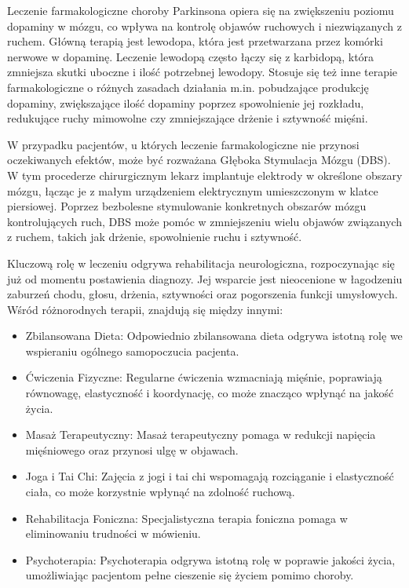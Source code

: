 Leczenie farmakologiczne choroby Parkinsona opiera się na zwiększeniu poziomu dopaminy w mózgu, co wpływa na kontrolę objawów
ruchowych i niezwiązanych z ruchem. Główną terapią jest lewodopa, która jest przetwarzana przez komórki nerwowe w dopaminę.
Leczenie lewodopą często łączy się z karbidopą, która zmniejsza skutki uboczne i ilość potrzebnej lewodopy.
Stosuje się też inne terapie farmakologiczne o różnych zasadach działania m.in. pobudzające produkcję dopaminy,
zwiększające ilość dopaminy poprzez spowolnienie jej rozkładu, redukujące ruchy mimowolne czy zmniejszające drżenie i sztywność mięśni.

W przypadku pacjentów, u których leczenie farmakologiczne nie przynosi oczekiwanych efektów, może być rozważana Głęboka Stymulacja Mózgu (DBS).
W tym procederze chirurgicznym lekarz implantuje elektrody w określone obszary mózgu, łącząc je z małym urządzeniem elektrycznym umieszczonym w klatce piersiowej.
Poprzez bezbolesne stymulowanie konkretnych obszarów mózgu kontrolujących ruch, DBS może pomóc w zmniejszeniu wielu objawów związanych z ruchem,
takich jak drżenie, spowolnienie ruchu i sztywność.

Kluczową rolę w leczeniu odgrywa rehabilitacja neurologiczna, rozpoczynając się już od momentu postawienia diagnozy.
Jej wsparcie jest nieocenione w łagodzeniu zaburzeń chodu, głosu, drżenia, sztywności oraz pogorszenia funkcji umysłowych.
Wśród różnorodnych terapii, znajdują się między innymi:
\begin{itemize}[itemsep=0.1pt]
	\item Zbilansowana Dieta: Odpowiednio zbilansowana dieta odgrywa istotną rolę we wspieraniu ogólnego samopoczucia pacjenta.
	\item Ćwiczenia Fizyczne: Regularne ćwiczenia wzmacniają mięśnie, poprawiają równowagę, elastyczność i koordynację, co może znacząco wpłynąć na jakość życia.
	\item Masaż Terapeutyczny: Masaż terapeutyczny pomaga w redukcji napięcia mięśniowego oraz przynosi ulgę w objawach.
	\item Joga i Tai Chi: Zajęcia z jogi i tai chi wspomagają rozciąganie i elastyczność ciała, co może korzystnie wpłynąć na zdolność ruchową.
	\item Rehabilitacja Foniczna: Specjalistyczna terapia foniczna pomaga w eliminowaniu trudności w mówieniu.
	\item Psychoterapia: Psychoterapia odgrywa istotną rolę w poprawie jakości życia, umożliwiając pacjentom pełne cieszenie się życiem pomimo choroby.
\end{itemize}

